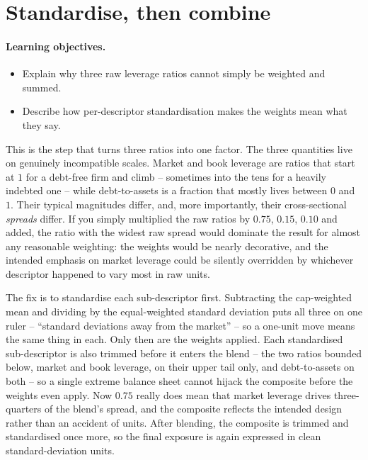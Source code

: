\documentclass[11pt]{article}
\theoremstyle{definition}
\theoremstyle{plain}
\theoremstyle{remark}
\begin{document}
\section{Standardise, then combine}\label{sec:combine}

\paragraph{Learning objectives.}
\begin{itemize}[leftmargin=1.4em,topsep=2pt]
  \item Explain why three raw leverage ratios cannot simply be weighted and summed.
  \item Describe how per-descriptor standardisation makes the weights mean what they say.
\end{itemize}

This is the step that turns three ratios into one factor. The three quantities live on genuinely incompatible scales. Market and book leverage are ratios that start at $1$ for a debt-free firm and climb -- sometimes into the tens for a heavily indebted one -- while debt-to-assets is a fraction that mostly lives between $0$ and $1$. Their typical magnitudes differ, and, more importantly, their cross-sectional \emph{spreads} differ. If you simply multiplied the raw ratios by $0.75$, $0.15$, $0.10$ and added, the ratio with the widest raw spread would dominate the result for almost any reasonable weighting: the weights would be nearly decorative, and the intended emphasis on market leverage could be silently overridden by whichever descriptor happened to vary most in raw units.

The fix is to standardise each sub-descriptor first. Subtracting the cap-weighted mean and dividing by the equal-weighted standard deviation puts all three on one ruler -- ``standard deviations away from the market'' -- so a one-unit move means the same thing in each. Only then are the weights applied. Each standardised sub-descriptor is also trimmed before it enters the blend -- the two ratios bounded below, market and book leverage, on their upper tail only, and debt-to-assets on both -- so a single extreme balance sheet cannot hijack the composite before the weights even apply. Now $0.75$ really does mean that market leverage drives three-quarters of the blend's spread, and the composite reflects the intended design rather than an accident of units. After blending, the composite is trimmed and standardised once more, so the final exposure is again expressed in clean standard-deviation units.
\end{document}

